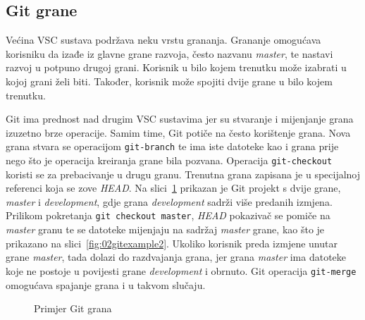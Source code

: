 \subsection{Git grane}
Većina VSC sustava podržava neku vrstu grananja. Grananje omogućava korisniku da izađe iz glavne
grane razvoja, često nazvanu \textit{master}, te nastavi razvoj u potpuno drugoj grani. Korisnik u
bilo kojem trenutku može izabrati u kojoj grani želi biti. Također, korisnik može spojiti dvije
grane u bilo kojem trenutku.

Git ima prednost nad drugim VSC sustavima jer su stvaranje i mijenjanje grana izuzetno brze
operacije. Samim time, Git potiče na često korištenje grana. Nova grana stvara se operacijom
\texttt{git-branch} te ima iste datoteke kao i grana prije nego što je operacija kreiranja grane
bila pozvana. Operacija \texttt{git-checkout} koristi se za prebacivanje u drugu granu. Trenutna
grana zapisana je u specijalnoj referenci koja se zove \textit{HEAD}. Na
slici~\ref{fig:02gitexample} prikazan je Git projekt s dvije grane, \textit{master} i
\textit{development}, gdje grana \textit{development} sadrži više predanih izmjena. Prilikom
pokretanja \texttt{git checkout master}, \textit{HEAD} pokazivač se pomiče na \textit{master} granu
te se datoteke mijenjaju na sadržaj \textit{master} grane, kao što je prikazano na
slici~\ref{fig:02gitexample2}. Ukoliko korisnik preda izmjene unutar grane \textit{master}, tada
dolazi do razdvajanja grana, jer grana \textit{master} ima datoteke koje ne postoje u povijesti
grane \textit{development} i obrnuto. Git operacija \texttt{git-merge} omogućava spajanje grana i u
takvom slučaju.

\begin{figure}[h]
    \centering

    \caption{Primjer Git grana}%
    \label{fig:02gitexample}
\end{figure}

